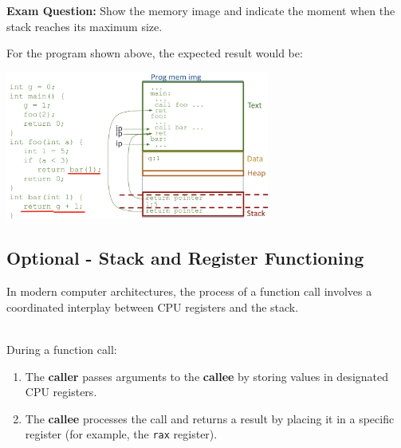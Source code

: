 \documentclass[../../compsys.tex]{subfiles}
\begin{document}
\textbf{Exam Question:} Show the memory image and indicate the moment when the stack reaches its maximum size.


For the program shown above, the expected result would be:
\begin{center}
  \includegraphics[width=0.65\textwidth]{chapters/L4/images/biggest-stack.png}
\end{center}

\newpage

\subsection{Optional - Stack and Register Functioning}

In modern computer architectures, the process of a function call involves a coordinated interplay between CPU registers and the stack.\\[8px]

\begin{definition}
\leavevmode\\[5px]
During a function call:
\begin{enumerate}
    \item The \textbf{caller} passes arguments to the \textbf{callee} by storing values in designated CPU registers.
    \item The \textbf{callee} processes the call and returns a result by placing it in a specific register (for example, the \texttt{rax} register).
\end{enumerate}
\end{definition}
\end{document}
